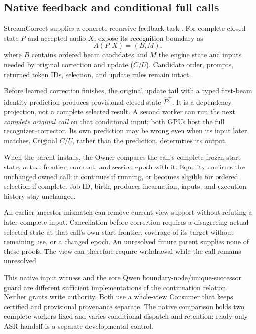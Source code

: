\subsection{Native feedback and conditional full calls}
\label{subsec:native_full_calls}
StreamCorrect supplies a concrete recursive feedback task
\cite{vu2026streamcorrect}. For complete closed state $P$ and accepted
audio $X$, expose its recognition boundary as
\begin{equation}
 A(P,X)=(B,M),
\end{equation}
where $B$ contains ordered beam candidates and $M$ the engine state and
inputs needed by original correction and update ($C/U$). Candidate order,
prompts, returned token IDs, selection, and update rules remain intact.

Before learned correction finishes, the original update tail with a typed
first-beam identity prediction produces provisional closed state
$\widehat P^+$. It is a dependency projection, not a complete selected
result. A second worker can run the next \emph{complete original call} on
that conditional input; both GPUs host the full recognizer--corrector.
Its own prediction may be wrong even when its input later matches.
Original $C/U$, rather than the prediction, determines its output.

When the parent installs, the Owner compares the call's complete frozen
start state, actual frontier, contract, and session epoch with it. Equality
confirms the unchanged owned call: it continues if running, or becomes
eligible for ordered selection if complete. Job ID, birth, producer
incarnation, inputs, and execution history stay unchanged.

An earlier ancestor mismatch can remove current view support without
refuting a later complete input. Cancellation before correction requires
a disagreeing actual selected state at that call's own start frontier,
coverage of its target without remaining use, or a changed epoch. An
unresolved future parent supplies none of these proofs. The view can
therefore require withdrawal while the call remains unresolved.

This native input witness and the core Qwen boundary-node/unique-successor
guard are different sufficient implementations of the continuation
relation. Neither grants write authority. Both use a whole-view Consumer
that keeps certified and provisional provenance separate. The native
comparison holds two complete workers fixed and varies conditional
dispatch and retention; ready-only ASR handoff is a separate developmental
control.

